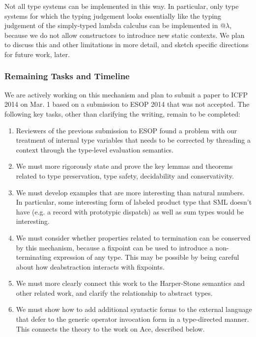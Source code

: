 Not all type systems can be implemented in this way. In particular, only type systems for which the typing judgement looks essentially like the typing judgement of the simply-typed lambda calculus can be implemented in @$\lambda$, because we do not allow constructors to introduce new static contexts. We plan to discuss this and other limitations in more detail, and sketch specific directions for future work, later.

\subsubsection{Remaining Tasks and Timeline}
We are actively working on this mechanism and plan to submit a paper to ICFP 2014 on Mar. 1 based on a submission to ESOP 2014 that was not accepted. The following key tasks, other than clarifying the writing, remain to be completed:

\begin{enumerate}
\item Reviewers of the previous submission to ESOP found a problem with our treatment of internal type variables that needs to be corrected by threading a context through the type-level evaluation semantics.
\item We must more rigorously state and prove the key lemmas and theorems related to type preservation, type safety, decidability and conservativity. 
\item We must develop examples that are more interesting than natural numbers. In particular, some interesting form of labeled product type that SML doesn't have (e.g. a record with prototypic dispatch) as well as sum types would be interesting.
\item We must consider whether properties related to termination can be conserved by this mechanism, because a fixpoint can be used to introduce a non-terminating expression of any type. This may be possible by being careful about how deabstraction interacts with fixpoints.
\item We must more clearly connect this work to the Harper-Stone semantics and other related work, and clarify  the relationship to abstract types.
\item We must show how to add additional syntactic forms to the external language that defer to the generic operator invocation form in a type-directed manner. This connects the theory to the work on Ace, described below. 
\end{enumerate}

